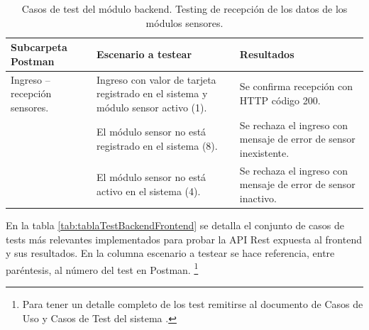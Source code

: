 \begin{table}[h]
	\centering
	\caption[Tipos de pruebas backend]{Casos de test del módulo backend. Testing de recepción de los datos de los módulos sensores.}
	\begin{tabular}{p{3.5cm} p{4.5cm} p{4cm}} 	

		\toprule
		\textbf{Subcarpeta Postman} & 
		\textbf{Escenario a testear} &
		\textbf{Resultados} 
		\\
		\midrule

 Ingreso – recepción sensores.                  
& Ingreso con valor de tarjeta registrado en el sistema y módulo sensor activo (1).
& Se confirma recepción con HTTP código 200.  \\
& El módulo sensor no está registrado en el sistema  (8).
& Se rechaza el ingreso con mensaje de error de sensor inexistente. \\
& El módulo sensor no está activo en el sistema (4). 
& Se rechaza el ingreso con mensaje de error de sensor inactivo. \\
		\bottomrule
		\hline
	\end{tabular}
	\label{tab:tablaTestBackendSensor}
\end{table}


En la tabla \ref{tab:tablaTestBackendFrontend} se detalla el conjunto de casos de tests más relevantes implementados para probar la API Rest expuesta al frontend y sus resultados. En la columna escenario a testear se hace referencia, entre paréntesis, al número del test en Postman.  \footnote{\label{notaReusadaCasosTest}Para tener un detalle completo de los test remitirse al documento de Casos de Uso y Casos de Test del sistema \citep{WEBSITE:CasosUsoYTest}.}


